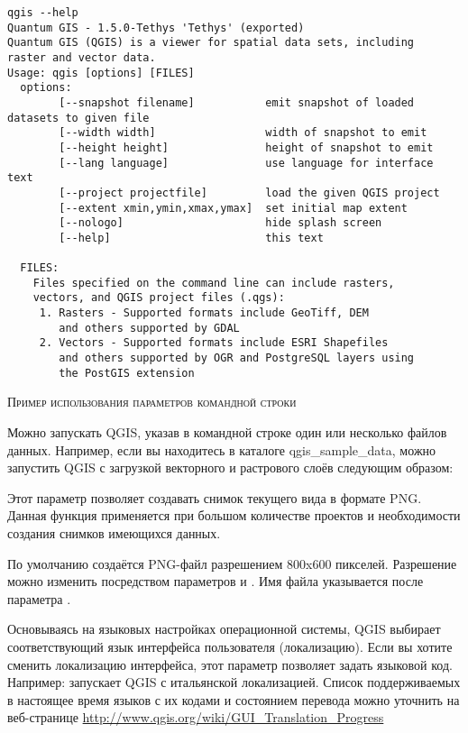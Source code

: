 \small
\begin{verbatim}
qgis --help
Quantum GIS - 1.5.0-Tethys 'Tethys' (exported)
Quantum GIS (QGIS) is a viewer for spatial data sets, including
raster and vector data.
Usage: qgis [options] [FILES]
  options:
        [--snapshot filename]           emit snapshot of loaded datasets to given file
        [--width width]                 width of snapshot to emit
        [--height height]               height of snapshot to emit
        [--lang language]               use language for interface text
        [--project projectfile]         load the given QGIS project
        [--extent xmin,ymin,xmax,ymax]  set initial map extent
        [--nologo]                      hide splash screen
        [--help]                        this text

  FILES:
    Files specified on the command line can include rasters,
    vectors, and QGIS project files (.qgs):
     1. Rasters - Supported formats include GeoTiff, DEM
        and others supported by GDAL
     2. Vectors - Supported formats include ESRI Shapefiles
        and others supported by OGR and PostgreSQL layers using
        the PostGIS extension
\end{verbatim}
\normalsize

\begin{Tip} \caption{\textsc{Пример использования параметров командной строки}}
Можно запускать QGIS, указав в командной строке один или несколько файлов
данных. Например, если вы находитесь в каталоге qgis\_sample\_data,
можно запустить QGIS с загрузкой векторного и растрового
слоёв следующим образом: \\
\end{Tip}

Этот параметр позволяет создавать снимок текущего вида в формате PNG. Данная
функция применяется при большом количестве проектов и необходимости
создания снимков имеющихся данных.

По умолчанию создаётся PNG-файл разрешением 800x600 пикселей. Разрешение
можно изменить посредством параметров
 и . Имя файла указывается после параметра
.

Основываясь на языковых настройках операционной системы, QGIS выбирает
соответствующий язык интерфейса пользователя (локализацию). Если вы хотите
сменить локализацию интерфейса, этот параметр позволяет задать языковой код. Например:
 запускает QGIS с итальянской локализацией. Список
поддерживаемых в настоящее время языков с их кодами и состоянием перевода можно
уточнить на веб-странице
\url{http://www.qgis.org/wiki/GUI_Translation_Progress}

